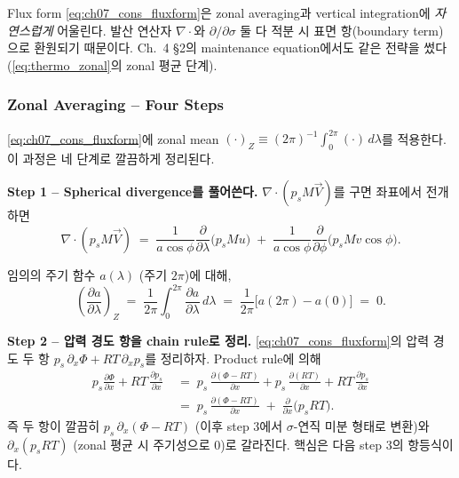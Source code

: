 \begin{remark}\label{rem:ch07_cons_why_flux}
Flux form \eqref{eq:ch07_cons_fluxform}은 zonal averaging과 vertical
integration에 \emph{자연스럽게} 어울린다.  발산 연산자 $\nabla\cdot$와
$\partial/\partial\sigma$ 둘 다 적분 시 표면 항(boundary term)으로 환원되기
때문이다.  Ch.~4 \S2의 maintenance equation에서도 같은 전략을 썼다
(\eqref{eq:thermo_zonal}의 zonal 평균 단계).
\end{remark}

\subsubsection{Zonal Averaging -- Four Steps}

\eqref{eq:ch07_cons_fluxform}에 zonal mean $(\cdot)_Z \equiv (2\pi)^{-1}
\int_0^{2\pi}(\cdot)\,d\lambda$를 적용한다.  이 과정은 네 단계로 깔끔하게
정리된다.

\medskip



\noindent\textbf{Step 1 -- Spherical divergence를 풀어쓴다.}
$\nabla\cdot(p_s M\vec V)$를 구면 좌표에서 전개하면
\begin{equation}\label{eq:ch07_cons_step1}
  \nabla\!\cdot\!(p_s M\vec V)
  \;=\;
  \frac{1}{a\cos\phi}\frac{\partial}{\partial \lambda}\bigl(p_s M u\bigr)
  \;+\;
  \frac{1}{a\cos\phi}\frac{\partial}{\partial \phi}
    \bigl(p_s M v\cos\phi\bigr).
\end{equation}

\begin{proposition}\label{prop:ch07_cons_zonal_vanish}
임의의 주기 함수 $a(\lambda)$ (주기 $2\pi$)에 대해,
\[
  \left(\frac{\partial a}{\partial \lambda}\right)_Z
  \;=\;
  \frac{1}{2\pi}\!\int_0^{2\pi}\!\frac{\partial a}{\partial\lambda}\,d\lambda
  \;=\;
  \frac{1}{2\pi}\bigl[a(2\pi)-a(0)\bigr]
  \;=\; 0.
\]
\end{proposition}


\medskip



\noindent\textbf{Step 2 -- 압력 경도 항을 chain rule로 정리.}
\eqref{eq:ch07_cons_fluxform}의 압력 경도 두 항
$p_s\,\partial_x\Phi + RT\,\partial_x p_s$를 정리하자.  Product rule에 의해
\begin{align}
  p_s\frac{\partial \Phi}{\partial x}
  + RT\,\frac{\partial p_s}{\partial x}
  &\;=\;
  p_s\,\frac{\partial(\Phi - RT)}{\partial x}
  + p_s\,\frac{\partial(RT)}{\partial x}
  + RT\,\frac{\partial p_s}{\partial x}
  \nonumber\\
  &\;=\;
  p_s\,\frac{\partial(\Phi - RT)}{\partial x}
  \;+\;
  \frac{\partial}{\partial x}\!\bigl(p_s RT\bigr).
  \label{eq:ch07_cons_step2_raw}
\end{align}
즉 두 항이 깔끔히 \emph{$p_s\,\partial_x(\Phi - RT)$} (이후 step 3에서
$\sigma$-연직 미분 형태로 변환)와 \emph{$\partial_x(p_s RT)$} (zonal 평균
시 주기성으로 0)로 갈라진다.  핵심은 다음 step 3의 항등식이다.

